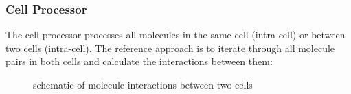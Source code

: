 \subsubsection{Cell Processor}
The cell processor processes all molecules in the same cell (intra-cell) or between two cells (intra-cell).
The reference approach is to iterate through all molecule pairs in both cells and calculate the interactions between them:
\begin{figure}
  \centering
  \caption{schematic of molecule interactions between two cells}
\end{figure}

